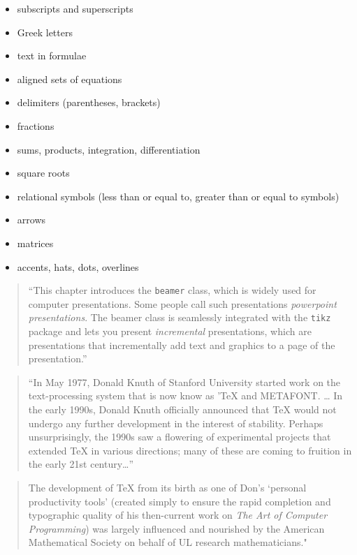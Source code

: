 \documentclass[]{tufte-book}
\providecommand{\tightlist}{%
  \setlength{\itemsep}{0pt}\setlength{\parskip}{0pt}}
\begin{document}
\begin{itemize}
\tightlist
\item
  subscripts and superscripts
\item
  Greek letters
\item
  text in formulae
\item
  aligned sets of equations
\item
  delimiters (parentheses, brackets)
\item
  fractions
\item
  sums, products, integration, differentiation
\item
  square roots
\item
  relational symbols (less than or equal to, greater than or equal to symbols)
\item
  arrows
\item
  matrices
\item
  accents, hats, dots, overlines
\end{itemize}

\begin{quote}
``This chapter introduces the \texttt{beamer} class, which is widely used for
computer presentations. Some people call such presentations \emph{powerpoint
presentations}. The beamer class is seamlessly integrated with the \texttt{tikz}
package and lets you present \emph{incremental} presentations, which are
presentations that incrementally add text and graphics to a page of the
presentation.'' \citep{van2012latex}
\end{quote}

\begin{quote}
``In May 1977, Donald Knuth of Stanford University started work on the
text-processing system that is now know as 'TeX and METAFONT. \ldots{} In the early
1990s, Donald Knuth officially announced that TeX would not undergo any further
development in the interest of stability. Perhaps unsurprisingly, the 1990s saw
a flowering of experimental projects that extended TeX in various directions;
many of these are coming to fruition in the early 21st century\ldots{}''
\citep{mittelbach2004latex}
\end{quote}

\begin{quote}
The development of TeX from its birth as one of Don's `personal productivity
tools' (created simply to ensure the rapid completion and typographic quality
of his then-current work on \emph{The Art of Computer Programming}) was largely
influenced and nourished by the American Mathematical Society on behalf of
UL research mathematicians." \citep{mittelbach2004latex}
\end{quote}
\end{document}
